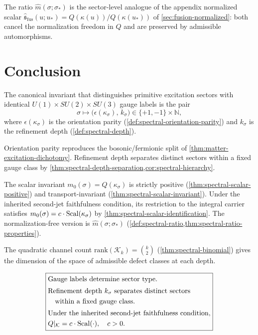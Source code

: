 \begin{remark}
\label{rem:spectral-ratio-appendix}
The ratio $\widehat{m}(\sigma;\sigma_*)$ is the sector-level analogue of
the appendix normalized scalar
$\widehat{\mathfrak s}_{\mathrm{fus}}(u;u_*) = Q(\kappa(u))/Q(\kappa(u_*))$ of
\cref{sec:fusion-normalized}: both cancel the normalization freedom in
$Q$ and are preserved by admissible automorphisms.
\end{remark}

\section{Conclusion}
\label{sec:spectral-conclusion}

The canonical invariant that distinguishes primitive excitation sectors
with identical $U(1)\times SU(2)\times SU(3)$ gauge labels is the pair
\[
  \sigma \longmapsto
  \bigl(\epsilon(\kappa_\sigma),\, k_\sigma\bigr)
  \in \{+1,-1\} \times \mathbb N,
\]
where $\epsilon(\kappa_\sigma)$ is the orientation parity
(\cref{def:spectral-orientation-parity}) and $k_\sigma$ is the
refinement depth (\cref{def:spectral-depth}).

Orientation parity reproduces the bosonic/fermionic split of
\cref{thm:matter-excitation-dichotomy}.
Refinement depth separates distinct sectors within a fixed gauge class
by \cref{thm:spectral-depth-separation,cor:spectral-hierarchy}.

The scalar invariant $m_0(\sigma) = Q(\kappa_\sigma)$ is strictly
positive (\cref{thm:spectral-scalar-positive}) and transport-invariant
(\cref{thm:spectral-scalar-invariant}).
Under the inherited second-jet faithfulness condition, its restriction
to the integral carrier satisfies
$m_0(\sigma) = c \cdot \operatorname{Scal}(\kappa_\sigma)$
by \cref{thm:spectral-scalar-identification}.
The normalization-free version is $\widehat{m}(\sigma;\sigma_*)$
(\cref{def:spectral-ratio,thm:spectral-ratio-properties}).

The quadratic channel count $\mathrm{rank}(\mathcal K_k) = \binom{k}{2}$
(\cref{thm:spectral-binomial}) gives the dimension of the space of
admissible defect classes at each depth.

\[
\boxed{
\begin{aligned}
&\text{Gauge labels determine sector type.} \\[2pt]
&\text{Refinement depth } k_\sigma \text{ separates distinct sectors}\\
&\quad\text{within a fixed gauge class.} \\[2pt]
&\text{Under the inherited second-jet faithfulness condition,} \\
&Q|_{\mathcal K} = c \cdot \operatorname{Scal}(\cdot),\quad c > 0.
\end{aligned}
}
\]

